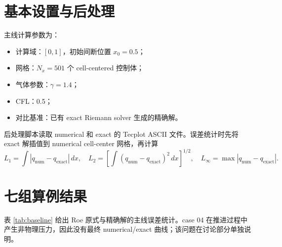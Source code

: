 \documentclass[UTF8,a4paper,11pt]{ctexart}
\begin{document}
\section{基本设置与后处理}

主线计算参数为：
\begin{itemize}
    \item 计算域：\([0,1]\)，初始间断位置 \(x_0=0.5\)；
    \item 网格：\(N_x=501\) 个 cell-centered 控制体；
    \item 气体参数：\(\gamma=1.4\)；
    \item CFL：0.5；
    \item 对比基准：已有 exact Riemann solver 生成的精确解。
\end{itemize}

后处理脚本读取 numerical 和 exact 的 Tecplot ASCII 文件。误差统计时先将 exact 解插值到 numerical cell-center 网格，再计算
\begin{equation}
    L_1=\int |q_{\mathrm{num}}-q_{\mathrm{exact}}|\,dx,
    \quad
    L_2=\left[\int (q_{\mathrm{num}}-q_{\mathrm{exact}})^2\,dx\right]^{1/2},
    \quad
    L_\infty=\max |q_{\mathrm{num}}-q_{\mathrm{exact}}|.
\end{equation}

\section{七组算例结果}

表 \ref{tab:baseline} 给出 Roe 原式与精确解的主线误差统计。case 04 在推进过程中产生非物理压力，因此没有最终 numerical/exact 曲线；该问题在讨论部分单独说明。
\end{document}
